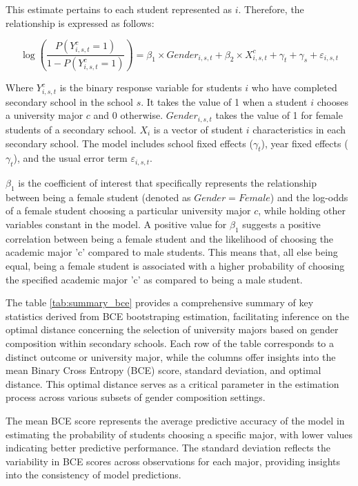 This estimate pertains to each student represented as $i$. Therefore, the relationship is expressed as follows:

\begin{equation}
     \log\left(\frac{P(Y_{i,s,t}^c  = 1)}{1 - P(Y_{i,s,t}^c  = 1)}\right) =  
       \beta_1 \times Gender_{i,s,t} +
       \beta_2 \times X_{i,s,t}^c  + \gamma_{t} + \gamma_{s} + 
       \varepsilon_{i,s,t}
\end{equation}

Where $Y_{i,s,t}^c$ is the binary response variable for students $i$ who have completed secondary school in the school $s$. It takes the value of 1 when a student $i$ chooses a university major $c$ and 0 otherwise. $Gender_{i,s,t}$ takes the value of 1 for female students of a secondary school. $X_i$ is a vector of student $i$ characteristics in each secondary school. The model includes school fixed effects ($\gamma_{t} $), year fixed effects ($\gamma_{t}$), and the usual error term $\varepsilon_{i,s,t}$.

$\beta_1$ is the coefficient of interest that specifically represents the relationship between being a female student (denoted as \( Gender = Female \)) and the log-odds of a female student choosing a particular university major $c$, while holding other variables constant in the model. A positive value for $\beta_1$ suggests a positive correlation between being a female student and the likelihood of choosing the academic major 'c' compared to male students. This means that, all else being equal, being a female student is associated with a higher probability of choosing the specified academic major 'c' as compared to being a male student.

The table  \ref{tab:summary_bce} provides a comprehensive summary of key statistics derived from BCE bootstraping estimation, facilitating inference on the optimal distance concerning the selection of university majors based on gender composition within secondary schools. Each row of the table corresponds to a distinct outcome or university major, while the columns offer insights into the mean Binary Cross Entropy (BCE) score, standard deviation, and optimal distance. This optimal distance serves as a critical parameter in the estimation process across various subsets of gender composition settings.




The mean BCE score represents the average predictive accuracy of the model in estimating the probability of students choosing a specific major, with lower values indicating better predictive performance. The standard deviation reflects the variability in BCE scores across observations for each major, providing insights into the consistency of model predictions.


